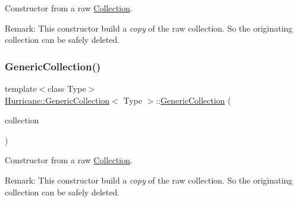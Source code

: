 Constructor from a raw \mbox{\hyperlink{classHurricane_1_1Collection}{Collection}}.

\begin{DoxyParagraph}{Remark\+: This constructor build a {\itshape copy} of the raw collection. So the originating}
collection can be safely deleted. 
\end{DoxyParagraph}
\mbox{\label{classHurricane_1_1GenericCollection_a9b77dc014864c2248f31b9dfee242d25}} 
\subsubsection{\texorpdfstring{Generic\+Collection()}{GenericCollection()}\hspace{0.1cm}{\footnotesize\ttfamily [2/3]}}
{\footnotesize\ttfamily template$<$class Type$>$ \\
\mbox{\hyperlink{classHurricane_1_1GenericCollection}{Hurricane\+::\+Generic\+Collection}}$<$ Type $>$\+::\mbox{\hyperlink{classHurricane_1_1GenericCollection}{Generic\+Collection}} (\begin{DoxyParamCaption}\item[{const \mbox{\hyperlink{classHurricane_1_1GenericCollection}{Generic\+Collection}}$<$ Type $>$ \&}]{collection }\end{DoxyParamCaption})\hspace{0.3cm}{\ttfamily [inline]}}

Constructor from a raw \mbox{\hyperlink{classHurricane_1_1Collection}{Collection}}.

\begin{DoxyParagraph}{Remark\+: This constructor build a {\itshape copy} of the raw collection. So the originating}
collection can be safely deleted. 
\end{DoxyParagraph}
\mbox{\label{classHurricane_1_1GenericCollection_a8e4f70213efb85c0ba802b7de9c03b32}} 
